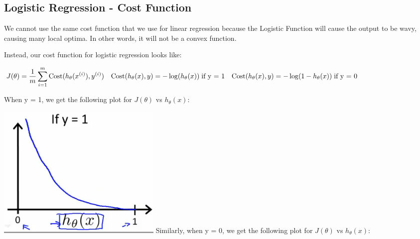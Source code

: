 \documentclass[
]{article}
\begin{document}
\hypertarget{logistic-regression---cost-function}{%
\subsection{Logistic Regression - Cost
Function}\label{logistic-regression---cost-function}}

We cannot use the same cost function that we use for linear regression
because the Logistic Function will cause the output to be wavy, causing
many local optima. In other words, it will not be a convex function.

Instead, our cost function for logistic regression looks like:

\(\begin{align*}& J(\theta) = \dfrac{1}{m} \sum_{i=1}^m \mathrm{Cost}(h_\theta(x^{(i)}),y^{(i)}) \newline & \mathrm{Cost}(h_\theta(x),y) = -\log(h_\theta(x)) \; & \text{if y = 1} \newline & \mathrm{Cost}(h_\theta(x),y) = -\log(1-h_\theta(x)) \; & \text{if y = 0}\end{align*}\)

When y = 1, we get the following plot for \(J(\theta)\) vs
\(h_\theta (x)\):

\includegraphics{LR_cost.png} Similarly, when y = 0, we get the
following plot for \(J(\theta)\) vs \(h_\theta (x)\):
\end{document}
